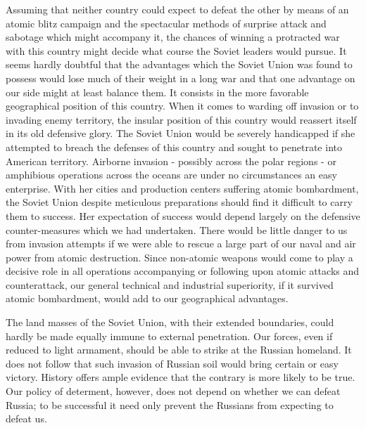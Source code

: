 Assuming that neither country could expect to defeat the other by means of an atomic blitz campaign and the spectacular methods of surprise attack and sabotage which might accompany it, the chances of winning a protracted war with this country might decide what course the Soviet leaders would pursue. It seems hardly doubtful that the advantages which the Soviet Union was found to possess would lose much of their weight in a long war and that one advantage on our side might at least balance them. It consists in the more favorable geographical position of this country. When it comes to warding off invasion or to invading enemy territory, the insular position of this country would reassert itself in its old defensive glory. The Soviet Union would be severely handicapped if she attempted to breach the defenses of this country and sought to penetrate into American territory. Airborne invasion - possibly across the polar regions - or amphibious operations across the oceans are under no circumstances an easy enterprise. With her cities and production centers suffering atomic bombardment, the Soviet Union despite meticulous preparations should find it difficult to carry them to success. Her expectation of success would depend largely on the defensive counter-measures which we had undertaken. There would be little danger to us from invasion attempts if we were able to rescue a large part of our naval and air power from atomic destruction. Since non-atomic weapons would come to play a decisive role in all operations accompanying or following upon atomic attacks and counterattack, our general technical and industrial superiority, if it survived atomic bombardment, would add to our geographical advantages.

The land masses of the Soviet Union, with their extended boundaries, could hardly be made equally immune to external penetration. Our forces, even if reduced to light armament, should be able to strike at the Russian homeland. It does not follow that such invasion of Russian soil would bring certain or easy victory. History offers ample evidence that the contrary is more likely to be true. Our policy of determent, however, does not depend on whether we can defeat Russia; to be successful it need only prevent the Russians from expecting to defeat us.


